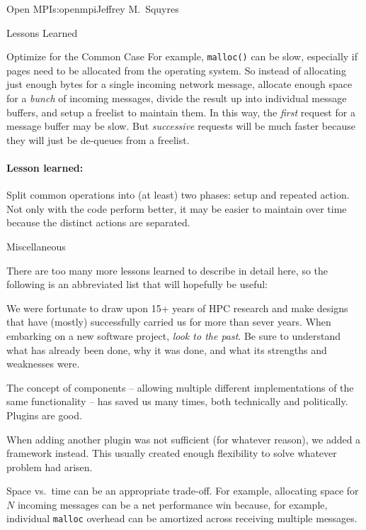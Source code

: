 \begin{aosachapter}{Open MPI}{s:openmpi}{Jeffrey M.\ Squyres}
\begin{aosasect1}{Lessons Learned}
\begin{aosasect2}{Optimize for the Common Case}
For example, {\tt malloc()} can be slow, especially if pages need to
be allocated from the operating system.  So instead of allocating just
enough bytes for a single incoming network message, allocate enough
space for a {\em bunch} of incoming messages, divide the result up
into individual message buffers, and setup a freelist to maintain
them.  In this way, the {\em first} request for a message buffer may
be slow.  But {\em successive} requests will be much faster because
they will just be de-queues from a freelist.


\paragraph{Lesson learned:} Split common operations into (at least)
two phases: setup and repeated action.  Not only with the code perform
better, it may be easier to maintain over time because the distinct
actions are separated.

\end{aosasect2}


\begin{aosasect2}{Miscellaneous}

There are too many more lessons learned to describe in detail here,
so the following is an abbreviated list that will hopefully be useful:

\begin{aosaitemize}
\item We were fortunate to draw upon 15+ years of HPC research and
  make designs that have (mostly) successfully carried us for more
  than sever years.  When embarking on a new software project, {\em
    look to the past}.  Be sure to understand what has already been
  done, why it was done, and what its strengths and weaknesses were.

\item The concept of components -- allowing multiple different
  implementations of the same functionality -- has saved us many
  times, both technically and politically.  Plugins are good.

\item When adding another plugin was not sufficient (for whatever
  reason), we added a framework instead.  This usually created enough
  flexibility to solve whatever problem had arisen.

\item Space vs.\ time can be an appropriate trade-off.  For example,
  allocating space for $N$ incoming messages can be a net performance
  win because, for example, individual {\tt malloc} overhead can be
  amortized across receiving multiple messages.


\end{aosaitemize}
\end{aosasect2}
\end{aosasect1}
\end{aosachapter}
